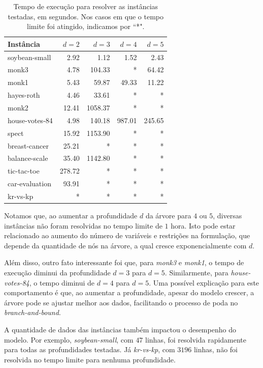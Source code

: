 \documentclass[12pt,a4paper]{article}
\begin{document}
\begin{table}[H]
    \centering
    \renewcommand{\arraystretch}{1.2} 
    \setlength{\tabcolsep}{25pt}
    \begin{tabular}{lrrrr}
    \hline
    Instância      & $d=2$  & $d=3$  & $d=4$  & $d=5$ \\ \hline
    soybean-small  & 2.92   & 1.12    & 1.52   & 2.43   \\
    monk3          & 4.78   & 104.33  & * & 64.42  \\
    monk1          & 5.43   & 59.87   & 49.33  & 11.22  \\
    hayes-roth     & 4.46   & 33.61   & * & * \\
    monk2          & 12.41  & 1058.37 & * & * \\
    house-votes-84 & 4.98   & 140.18  & 987.01 & 245.65 \\
    spect          & 15.92  & 1153.90 & * & * \\
    breast-cancer  & 25.21  & * & * & * \\
    balance-scale  & 35.40  & 1142.80 & * & * \\
    tic-tac-toe    & 278.72 & * & * & * \\
    car-evaluation & 93.91  & * & * & * \\
    kr-vs-kp       & * & * & * & * \\ \hline
    \end{tabular}
    \caption{Tempo de execução para resolver as instâncias testadas, em segundos. Nos casos em que o tempo limite foi 
atingido, indicamos por ``*".}
    \label{tab:resultados}
\end{table}

Notamos que, ao aumentar a profundidade $d$ da árvore para $4$ ou $5$,
diversas instâncias não foram resolvidas no tempo limite de $1$ hora. Isto pode estar
relacionado ao aumento do número de variáveis e restrições na formulação, que depende 
da quantidade de nós na árvore, a qual cresce exponencialmente com $d$.

Além disso, outro fato interessante foi que, para \emph{monk3} e \emph{monk1}, o tempo de execução
diminui da profundidade $d=3$ para $d=5$. Similarmente, para \emph{house-votes-84}, o tempo
diminui de $d=4$ para $d=5$. Uma possível explicação para este comportamento
é que, ao aumentar a profundidade, apesar do modelo crescer, a árvore pode se ajustar melhor aos dados,
facilitando o processo de poda no \emph{branch-and-bound}.

A quantidade de dados das instâncias também impactou o desempenho do modelo. Por exemplo, \emph{soybean-small}, com $47$ linhas,
foi resolvida rapidamente para todas as profundidades testadas.
Já \emph{kr-vs-kp}, com $3196$ linhas, não foi resolvida no tempo limite para nenhuma profundidade.
\end{document}
